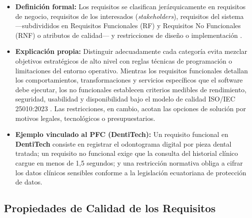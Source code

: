 \documentclass[11pt,a4paper]{article}
\begin{document}
\begin{itemize}
    \item \textbf{Definición formal:} Los requisitos se clasifican jerárquicamente en requisitos de negocio, requisitos de los interesados (\textit{stakeholders}), requisitos del sistema ---subdivididos en Requisitos Funcionales (RF) y Requisitos No Funcionales (RNF) o atributos de calidad--- y restricciones de diseño o implementación \cite{ieee29148, iso25010, swebok2024}.
    \item \textbf{Explicación propia:} Distinguir adecuadamente cada categoría evita mezclar objetivos estratégicos de alto nivel con reglas técnicas de programación o limitaciones del entorno operativo. Mientras los requisitos funcionales detallan los comportamientos, transformaciones y servicios específicos que el software debe ejecutar, los no funcionales establecen criterios medibles de rendimiento, seguridad, usabilidad y disponibilidad bajo el modelo de calidad ISO/IEC 25010:2023 \cite{iso25010}. Las restricciones, en cambio, acotan las opciones de solución por motivos legales, tecnológicos o presupuestarios.
    \item \textbf{Ejemplo vinculado al PFC (DentiTech):} Un requisito funcional en \textbf{DentiTech} consiste en registrar el odontograma digital por pieza dental tratada; un requisito no funcional exige que la consulta del historial clínico cargue en menos de 1,5 segundos; y una restricción normativa obliga a cifrar los datos clínicos sensibles conforme a la legislación ecuatoriana de protección de datos.
\end{itemize}

\subsection{Propiedades de Calidad de los Requisitos}
\end{document}
